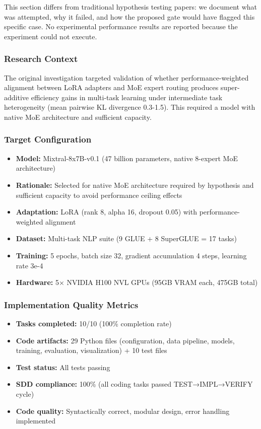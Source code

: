 
This section differs from traditional hypothesis testing papers: we document what was attempted, why it failed, and how the proposed gate would have flagged this specific case. No experimental performance results are reported because the experiment could not execute.

\subsubsection{Research Context}

The original investigation targeted validation of whether performance-weighted alignment between LoRA adapters and MoE expert routing produces super-additive efficiency gains in multi-task learning under intermediate task heterogeneity (mean pairwise KL divergence 0.3-1.5). This required a model with native MoE architecture and sufficient capacity.

\subsubsection{Target Configuration}

\begin{itemize}
\item \textbf{Model:} Mixtral-8x7B-v0.1 (47 billion parameters, native 8-expert MoE architecture)
\item \textbf{Rationale:} Selected for native MoE architecture required by hypothesis and sufficient capacity to avoid performance ceiling effects
\item \textbf{Adaptation:} LoRA (rank 8, alpha 16, dropout 0.05) with performance-weighted alignment
\item \textbf{Dataset:} Multi-task NLP suite (9 GLUE + 8 SuperGLUE = 17 tasks)
\item \textbf{Training:} 5 epochs, batch size 32, gradient accumulation 4 steps, learning rate 3e-4
\item \textbf{Hardware:} 5× NVIDIA H100 NVL GPUs (95GB VRAM each, 475GB total)
\end{itemize}

\subsubsection{Implementation Quality Metrics}

\begin{itemize}
\item \textbf{Tasks completed:} 10/10 (100\% completion rate)
\item \textbf{Code artifacts:} 29 Python files (configuration, data pipeline, models, training, evaluation, visualization) + 10 test files
\item \textbf{Test status:} All tests passing
\item \textbf{SDD compliance:} 100\% (all coding tasks passed TEST→IMPL→VERIFY cycle)
\item \textbf{Code quality:} Syntactically correct, modular design, error handling implemented
\end{itemize}

